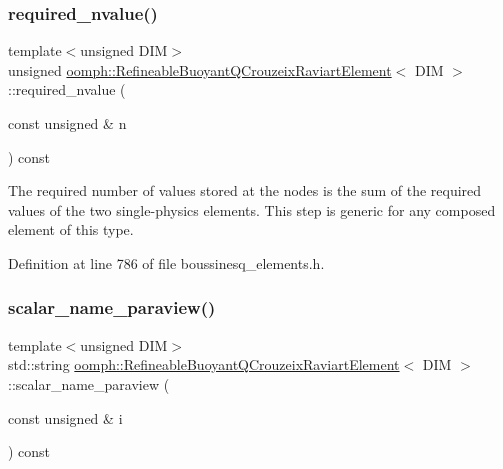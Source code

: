 \subsubsection{\texorpdfstring{required\+\_\+nvalue()}{required\_nvalue()}}
{\footnotesize\ttfamily template$<$unsigned D\+IM$>$ \\
unsigned \hyperlink{classoomph_1_1RefineableBuoyantQCrouzeixRaviartElement}{oomph\+::\+Refineable\+Buoyant\+Q\+Crouzeix\+Raviart\+Element}$<$ D\+IM $>$\+::required\+\_\+nvalue (\begin{DoxyParamCaption}\item[{const unsigned \&}]{n }\end{DoxyParamCaption}) const\hspace{0.3cm}{\ttfamily [inline]}}



The required number of values stored at the nodes is the sum of the required values of the two single-\/physics elements. This step is generic for any composed element of this type. 



Definition at line 786 of file boussinesq\+\_\+elements.\+h.

\mbox{\label{classoomph_1_1RefineableBuoyantQCrouzeixRaviartElement_ae9b9687a5a15a0089431ad1b143356e5}} 
\subsubsection{\texorpdfstring{scalar\+\_\+name\+\_\+paraview()}{scalar\_name\_paraview()}}
{\footnotesize\ttfamily template$<$unsigned D\+IM$>$ \\
std\+::string \hyperlink{classoomph_1_1RefineableBuoyantQCrouzeixRaviartElement}{oomph\+::\+Refineable\+Buoyant\+Q\+Crouzeix\+Raviart\+Element}$<$ D\+IM $>$\+::scalar\+\_\+name\+\_\+paraview (\begin{DoxyParamCaption}\item[{const unsigned \&}]{i }\end{DoxyParamCaption}) const\hspace{0.3cm}{\ttfamily [inline]}}



